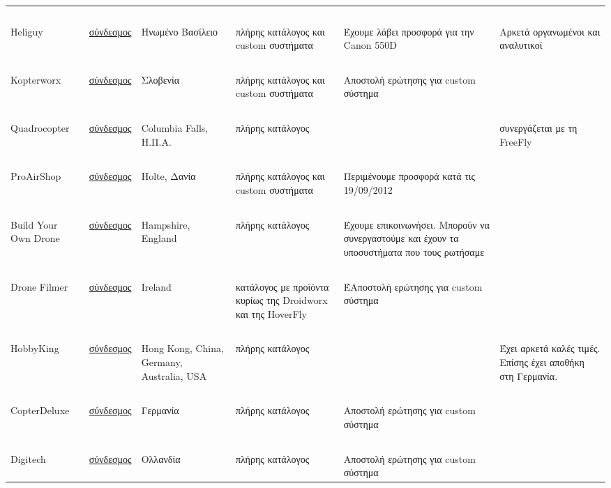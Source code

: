 \documentclass[a4paper, 12pt, twoside]{report}
\begin{document}
\begin{landscape}
\begin{longtable}{ m{2cm} m{2cm} m{2cm} m{4cm} m{4cm} m{4cm} }
				~\\
				Heliguy & \href{http://quadcopter.heliguy.com/}{σύνδεσμος} & Ηνωμένο Βασίλειο & πλήρης κατάλογος και custom συστήματα & Έχουμε λάβει προσφορά για την Canon 550D & Αρκετά οργανωμένοι και αναλυτικοί\\
				\hdashline
				~\\
				Kopterworx & \href{http://www.kopterworx.com/}{σύνδεσμος} & Σλοβενία & πλήρης κατάλογος και custom συστήματα & Αποστολή ερώτησης για custom σύστημα & \\
				\hdashline
				~\\
				Quadrocopter & \href{http://www.quadrocopter.com/}{σύνδεσμος} & Columbia Falls, Η.Π.Α. & πλήρης κατάλογος & & συνεργάζεται με τη FreeFly\\
				\hdashline
				~\\
				ProAirShop & \href{http://www.proairshop.com/}{σύνδεσμος} & Holte, Δανία & πλήρης κατάλογος και custom συστήματα & Περιμένουμε προσφορά κατά τις 19/09/2012 & \\
				\hdashline
				~\\
				Build Your Own Drone & \href{http://www.buildyourowndrone.co.uk/}{σύνδεσμος} & Hampshire, England & πλήρης κατάλογος & Έχουμε επικοινωνήσει. Μπορούν να συνεργαστούμε και έχουν τα υποσυστήματα που τους ρωτήσαμε & \\
				\hdashline
				~\\
				Drone Filmer & \href{http://www.dronefilmer.com}{σύνδεσμος} & Ireland & κατάλογος με προϊόντα κυρίως της Droidworx και της HoverFly & ΈΑποστολή ερώτησης για custom σύστημα & \\
				\hdashline
				~\\
				HobbyKing & \href{http://www.hobbyking.com}{σύνδεσμος} & Hong Kong, China, Germany, Australia, USA & πλήρης κατάλογος & & Έχει αρκετά καλές τιμές. Επίσης έχει αποθήκη στη Γερμανία.\\
				\hdashline
				~\\
				CopterDeluxe & \href{http://www.copterdeluxe.com}{σύνδεσμος} & Γερμανία & πλήρης κατάλογος &  Αποστολή ερώτησης για custom σύστημα &\\
				\hdashline
				~\\
				Digitech & \href{http://digitech.nl/}{σύνδεσμος} & Ολλανδία & πλήρης κατάλογος &  Αποστολή ερώτησης για custom σύστημα &\\
				\hline
		\end{longtable}
		\end{landscape}
		
\end{document}
